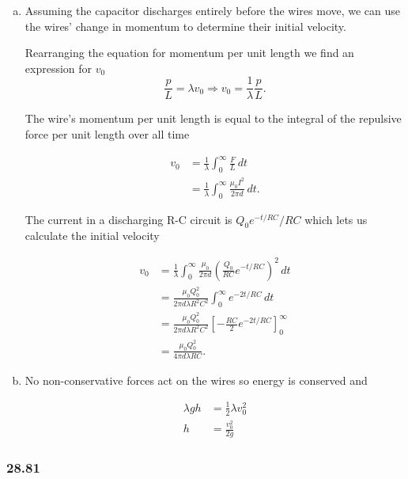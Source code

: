 \documentclass{article}
\begin{document}
\begin{enumerate}[(a)]
  \item Assuming the capacitor discharges entirely before the wires move, we can use the wires' change in momentum to determine their initial velocity.

        Rearranging the equation for momentum per unit length we find an expression for $v_0$ \[\frac{p}{L} = \lambda v_0 \Rightarrow v_0 = \frac{1}{\lambda} \frac{p}{L}.\]

        The wire's momentum per unit length is equal to the integral of the repulsive force per unit length over all time

        \begin{align*}
          v_0 & = \frac{1}{\lambda} \int_0^\infty \frac{F}{L} \,dt                \\
              & = \frac{1}{\lambda} \int_0^\infty \frac{\mu_0 I^2}{2 \pi d} \,dt.
        \end{align*}

        The current in a discharging R-C circuit is $Q_0 e^{-t / R C} / R C$ which lets us calculate the initial velocity

        \begin{align*}
          v_0 & = \frac{1}{\lambda} \int_0^\infty \frac{\mu_0}{2 \pi d} \left( \frac{Q_0}{R C} e^{-t / R C} \right)^2 \,dt \\
              & = \frac{\mu_0 Q_0^2}{2 \pi d \lambda R^2 C^2} \int_0^\infty e^{-2 t / R C} \,dt                            \\
              & = \frac{\mu_0 Q_0^2}{2 \pi d \lambda R^2 C^2} \left[ -\frac{R C}{2} e^{-2 t / R C} \right]_0^\infty        \\
              & = \frac{\mu_0 Q_0^2}{4 \pi d \lambda R C}.
        \end{align*}

  \item No non-conservative forces act on the wires so energy is conserved and

        \begin{align*}
          \lambda g h & = \frac{1}{2} \lambda v_0^2 \\
          h           & = \frac{v_0^2}{2 g}
        \end{align*}
\end{enumerate}

\subsubsection{28.81}
\end{document}
